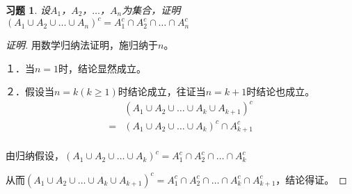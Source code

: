 \documentclass{article}
\begin{document}
\begin{CJK}{UTF8}{gbsn}
\newtheorem*{Ex}{习题}
  \begin{Ex}
    设$A_1$，$A_2$，$\ldots$，$A_n$为集合，证明$(A_1\cup A_2\cup \ldots \cup A_n)^c = A_1^c\cap A_2^c\cap \ldots \cap A_n^c$
\end{Ex}

\begin{proof}[证明]
  用数学归纳法证明，施归纳于$n$。
  
  １．当$n=1$时，结论显然成立。

  ２．假设当$n=k(k\geq 1)$时结论成立，往证当$n=k+1$时结论也成立。
  \begin{equation*}
    \begin{split}
      &(A_1\cup A_2\cup \ldots \cup A_k \cup A_{k+1})^c\\
      =&(A_1\cup A_2\cup \ldots \cup A_k)^c \cap A_{k+1}^c\\
    \end{split}
  \end{equation*}
  
  由归纳假设，$(A_1\cup A_2\cup \ldots \cup A_k)^c = A_1^c\cap A_2^c\cap \ldots \cap A_k^c$

  从而$(A_1\cup A_2\cup \ldots \cup A_k\cup A_{k+1})^c = A_1^c\cap A_2^c\cap \ldots \cap A_k^c\cap A_{k+1}^c$，结论得证。
  
\end{proof}
\end{CJK}
\end{document}
